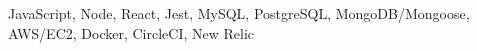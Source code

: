 

\begin{cventries}

\cventry
  {JavaScript, Node, React, Jest, MySQL, PostgreSQL, MongoDB/Mongoose, AWS/EC2, Docker, CircleCI, New Relic} %
  {} %
  {} %
  {} %
  {
  }

\end{cventries}
